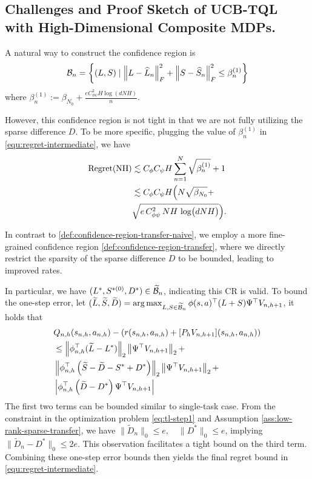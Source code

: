 \subsection{Challenges and Proof Sketch of UCB-TQL with High-Dimensional Composite MDPs.} \label{sec:challenges-ucb-tql}
A natural way to construct the confidence region is 
\begin{align}
\label{def:confidence-region-transfer-naive}
\mathcal{B}_n=\left\{(L,S) \mid \left\lVert L-\widehat L_n\right\rVert_F^2+\left\lVert S-\widehat S_n\right\rVert_F^2\leq \beta^{(1)}_n\right\}
\end{align}
where $\beta^{(1)}_n:=\beta_{N_0}+\frac{e C_{\phi\psi}^2H\log\left(dNH\right)}{n}$.

However, this confidence region is not tight in that we are not fully utilizing the sparse difference $D$. To be more specific,
plugging the value of $\beta_n^{(1)}$ in  \eqref{equ:regret-intermediate}, we have 
\[
\begin{aligned}
{\rm Regret(NH)}
   &\lesssim C_{\phi}C_{\psi}H \sum_{n=1}^{N}\sqrt{\beta_n^{(1)}} + 1\\
&\lesssim C_{\phi}C_{\psi}H\Bigl(N \sqrt{\beta_{N_0}}
     +\\& \sqrt{e\,C_{\phi\psi}^2\,N H \,\log\bigl(d N H\bigr)}\Bigr).
\end{aligned}
\]

In contrast to \eqref{def:confidence-region-transfer-naive}, we employ a more fine-grained confidence region \eqref{def:confidence-region-transfer}, where we directly restrict the sparsity of the sparse difference $D$ to be bounded, leading to improved rates.

In particular,  we have $(L^*,S^{*(0)},D^*)\in \widetilde{{\cal B}}_n$, indicating this CR is valid.
To bound the one-step error, let $(\widetilde{ L},\widetilde{ S},\widetilde{D})=\arg\max_{\substack{ L, S \in \widetilde{{\cal B}}_n}}\phi(s, a)^{\top} ( L+ S)  \Psi^{\top} V_{n, h+1}$, it holds that
\begin{equation}
     \begin{aligned}
     &Q_{n,h}(s_{n,h},a_{n,h})-\left( r(s_{n,h},a_{n,h})+[P_h V_{n,h+1}](s_{n,h},a_{n,h}) \right) \\
     &\leq \left\lVert\phi_{n, h}^{\top}(\widetilde{ L} -  L^{*})\right\rVert_2\left\lVert \Psi^{\top} V_{n, h+1}\right\rVert_{2}+\\&\left\lVert\phi_{n, h}^{\top}\left( \widetilde{ S}-\widetilde{D}-  S^*+D^* \right)\right\rVert_2\left\lVert \Psi^{\top} V_{n, h+1}\right\rVert_{2} +\\&\left|\phi_{n, h}^{\top}\left( \widetilde{D}- D^* \right) \Psi^{\top} V_{n, h+1}\right|
     \end{aligned}
    \end{equation}
The first two terms can be bounded similar to single-task case. From the constraint in the optimization problem \eqref{eq:tl-step1} and Assumption \ref{ass:low-rank-sparse-transfer}, we have $\|\tilde D_n\|_0\le e,\quad\|D^*\|_0\le e$, implying $\|\tilde D_n-D^*\|_0\le 2e$. This observation facilitates a tight bound on the third term. Combining these one-step error bounds then yields the final regret bound in \eqref{equ:regret-intermediate}.





